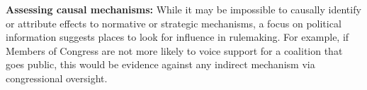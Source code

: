 


\textbf{Assessing causal mechanisms:} While it may be impossible to causally identify or attribute effects to normative or strategic mechanisms, 
a focus on political information suggests places to look for influence in rulemaking. For example, if Members of Congress are not more likely to voice support for a coalition that goes public, this would be evidence against any indirect mechanism via congressional oversight.

